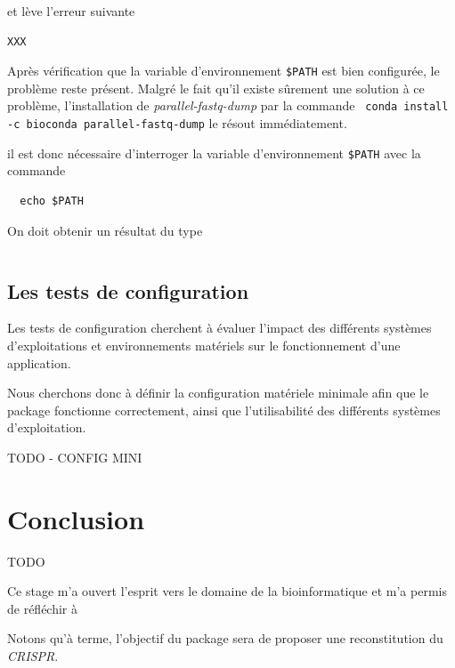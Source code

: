 \documentclass[twoside,a4paper,11pt,frenchb,openany]{report}
\begin{document}
et lève l'erreur suivante

\begin{verbatim}
XXX
\end{verbatim}

Après vérification que la variable d'environnement \texttt{\$PATH} est bien configurée, le problème reste présent. Malgré le fait qu'il existe sûrement une solution à ce problème, l'installation de \textit{parallel-fastq-dump} par la commande \texttt{  conda install -c bioconda parallel-fastq-dump} le résout immédiatement. 

il est donc nécessaire d'interroger la variable d'environnement \texttt{\$PATH} avec la commande

\begin{verbatim}
  echo $PATH
\end{verbatim}

On doit obtenir un résultat du type
\begin{verbatim}

\end{verbatim}



\section{Les tests de configuration}

Les tests de configuration cherchent à évaluer l'impact des différents systèmes d'exploitations et environnements matériels sur le fonctionnement d'une application.

Nous cherchons donc à définir la configuration matériele minimale afin que le package fonctionne correctement, ainsi que l'utilisabilité des différents systèmes d'exploitation.

TODO - CONFIG MINI






\chapter{Conclusion}

TODO

Ce stage m'a ouvert l'esprit vers le domaine de la bioinformatique et m'a permis de réfléchir à 

Notons qu'à terme, l'objectif du package sera de proposer une reconstitution du \textit{CRISPR}.
	
\end{document}
